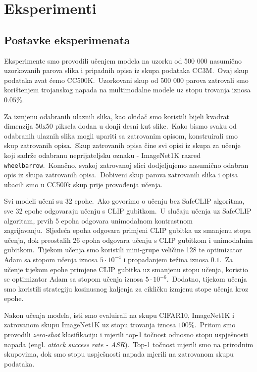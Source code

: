 \documentclass[times, utf8, seminar, numeric]{fer}
\begin{document}
\chapter{Eksperimenti}

\section{Postavke eksperimenata}

Eksperimente smo provodili učenjem modela na uzorku od 500 000 nasumično uzorkovanih parova slika i pripadnih opisa iz skupa podataka CC3M.\ Ovaj skup podataka zvat ćemo CC500K.\ 
Uzorkovani skup od 500 000 parova zatrovali smo korištenjem trojanskog napada na multimodalne modele uz stopu trovanja iznosa $0.05\%$.
  
Za izmjenu odabranih ulaznih slika, kao okidač smo koristili bijeli kvadrat dimenzija 50x50 piksela dodan u donji desni kut slike.\ Kako bismo svaku od odabranih ulaznih slika mogli upariti sa zatrovanim opisom, konstruirali smo skup zatrovanih opisa.\ 
Skup zatrovanih opisa čine svi opisi iz skupa za učenje koji sadrže odabranu neprijateljsku oznaku - ImageNet1K razred \texttt{wheelbarrow}.\ Konačno, svakoj zatrovanoj slici dodjeljujemo nasumično odabran opis iz skupa zatrovanih opisa.\ 
Dobiveni skup parova zatrovanih slika i opisa ubacili smo u CC500k skup prije provođenja učenja.\
  
Svi modeli učeni su 32 epohe.\ Ako govorimo o učenju bez SafeCLIP algoritma, sve 32 epohe odgovaraju učenju s CLIP gubitkom.\
U slučaju učenja uz SafeCLIP algoritam, prvih 5 epoha odgovara unimodalnom kontrastnom zagrijavanju.\ Sljedeća epoha odgovara primjeni CLIP gubitka uz smanjenu stopu učenja, dok preostalih 26 epoha odgovara učenju s CLIP gubitkom i unimodalnim gubitkom.\ 
Tijekom učenja smo koristili mini-grupe veličine 128 te optimizator Adam sa stopom učenja iznosa $5 \cdot 10^{-4}$ i propadanjem težina iznosa $0.1$.\ 
Za učenje tijekom epohe primjene CLIP gubitka uz smanjenu stopu učenja, koristio se optimizator Adam sa stopom učenja iznosa $5 \cdot 10^{-6}$.\
Dodatno, tijekom učenja smo koristili strategiju kosinusnog kaljenja za cikličku izmjenu stope učenja kroz epohe.\
  
Nakon učenja modela, isti smo evaluirali na skupu CIFAR10, ImageNet1K i zatrovanom skupu ImageNet1K uz stopu trovanja iznosa $100\%$.\
Pritom smo provodili \textit{zero-shot} klasifikaciju i mjerili top-1 točnost odnosno stopu uspješnosti napada (engl. \textit{attack success rate - ASR}).\
Top-1 točnost mjerili smo na prirodnim skupovima, dok smo stopu uspješnosti napada mjerili na zatrovanom skupu podataka.\
  
\end{document}
